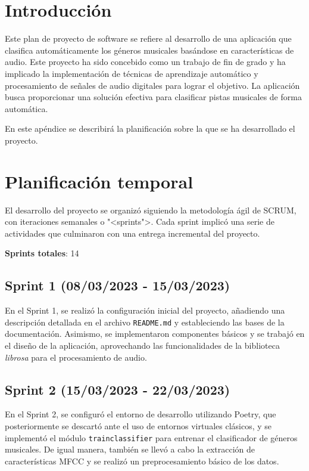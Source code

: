 
\section{Introducción}

Este plan de proyecto de software se refiere al desarrollo de una aplicación que clasifica automáticamente los géneros musicales basándose en características de audio. 
Este proyecto ha sido concebido como un trabajo de fin de grado y ha implicado la implementación de técnicas de aprendizaje automático y procesamiento de señales de audio digitales para lograr el objetivo.
La aplicación busca proporcionar una solución efectiva para clasificar pistas musicales de forma automática.

En este apéndice se describirá la planificación sobre la que se ha desarrollado el proyecto.

\section{Planificación temporal}

El desarrollo del proyecto se organizó siguiendo la metodología ágil de SCRUM, con iteraciones semanales o "<sprints">. 
Cada sprint implicó una serie de actividades que culminaron con una entrega incremental del proyecto.

\textbf{Sprints totales}: 14

\subsection{Sprint 1 (08/03/2023 - 15/03/2023)}

En el Sprint 1, se realizó la configuración inicial del proyecto, añadiendo una descripción detallada en el archivo \texttt{README.md} y estableciendo las bases de la documentación. Asimismo, se implementaron componentes básicos y se trabajó en el diseño de la aplicación, aprovechando las funcionalidades de la biblioteca \textit{librosa} para el procesamiento de audio.

\subsection{Sprint 2 (15/03/2023 - 22/03/2023)}

En el Sprint 2, se configuró el entorno de desarrollo utilizando Poetry, que posteriormente se descartó ante el uso de entornos virtuales clásicos, y se implementó el módulo \texttt{train\textunderscore classifier} para entrenar el clasificador de géneros musicales. De igual manera, también se llevó a cabo la extracción de características MFCC y se realizó un preprocesamiento básico de los datos.

